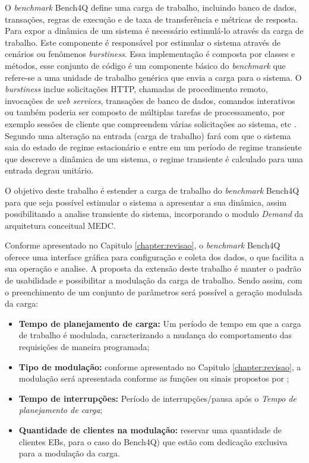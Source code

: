 O \textit{benchmark} Bench4Q define uma carga de trabalho, incluindo banco de dados, transações, regras de execução e de taxa de transferência e métricas de resposta.  Para expor a dinâmica de um sistema é necessário estimulá-lo através da carga de trabalho. Este componente é responsável por estimular o sistema através de cenários ou fenômenos \textit{burstiness}. Essa implementação é composta por classes e métodos, esse conjunto de código é um componente básico do \textit{benchmark} que refere-se a uma unidade de trabalho genérica que envia a carga para o sistema. O \textit{burstiness} inclue solicitações HTTP, chamadas de procedimento remoto, invocações de \textit{web services}, transações de banco de dados, comandos interativos ou também poderia ser composto de múltiplas tarefas de processamento, por exemplo sessões de cliente que compreendem várias solicitações ao sistema, etc \cite{Kounev2005}. Segundo  uma alteração na entrada (carga de trabalho) fará com que o sistema saia do estado de regime estacionário e entre em um período de regime transiente que descreve a dinâmica de um sistema, o regime transiente é calculado para uma entrada degrau unitário.

O objetivo deste trabalho é estender a carga de trabalho do \textit{benchmark} Bench4Q para que seja possível estimular o sistema a apresentar a sua dinâmica, assim possibilitando a analise transiente do sistema, incorporando o modulo \textit{Demand} da arquitetura conceitual MEDC. 

Conforme apresentado no Capitulo \ref{chapter:revisao}, o \textit{benchmark} Bench4Q oferece uma interface gráfica para configuração e coleta dos dados, o que facilita a sua operação e analise. A proposta da extensão deste trabalho é manter o padrão de usabilidade e possibilitar a modulação da carga de trabalho. Sendo assim, com o preenchimento de um conjunto de parâmetros será possível a geração modulada da carga:
\begin{itemize}
	\item \textbf{Tempo de planejamento de carga:} Um período de tempo em que a carga de trabalho é modulada, caracterizando a mudança do comportamento das requisições de maneira programada;
	
	\item \textbf{Tipo de modulação:} conforme apresentado no Capitulo \ref{chapter:revisao}, a modulação será apresentada conforme as funções ou sinais propostos por ;
	
	\item \textbf{Tempo de interrupções:} Período de interrupções/pausa após o \textit{Tempo de planejamento de carga};
	
	\item \textbf{Quantidade de clientes na modulação:} reservar uma quantidade de clientes EBs, para o caso do Bench4Q) que estão com dedicação exclusiva para a modulação da carga.
\end{itemize}


